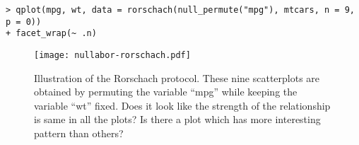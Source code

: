 %

\begin{verbatim}
> qplot(mpg, wt, data = rorschach(null_permute("mpg"), mtcars, n = 9, p = 0)) 
+ facet_wrap(~ .n)
\end{verbatim}

\begin{figure*}[hbtp]
\begin{center}
\texttt{[image: nullabor-rorschach.pdf]}
\caption{Illustration of the Rorschach protocol. These nine scatterplots are obtained by permuting the variable ``mpg'' while keeping the variable ``wt'' fixed. Does it look like the strength of the relationship is same in all the plots? Is there a plot which has more interesting pattern than others? }
\label{rorschach}
\end{center}
\end{figure*}

